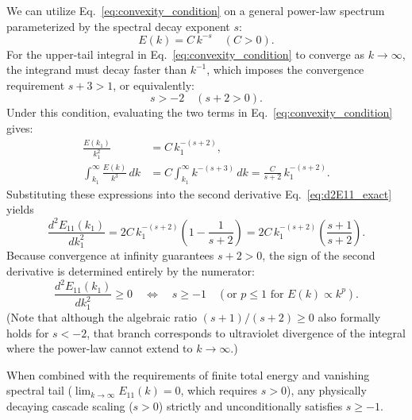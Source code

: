 \documentclass[lineno]{jfm}
\begin{document}
We can utilize Eq.~\eqref{eq:convexity_condition} on a general power-law spectrum parameterized by the spectral decay exponent $s$:
\begin{equation}
E(k) = C\,k^{-s} \quad (C > 0).
\label{eq:general_power_law}
\end{equation}
For the upper-tail integral in Eq.~\eqref{eq:convexity_condition} to converge as $k \to \infty$, the integrand must decay faster than $k^{-1}$, which imposes the convergence requirement $s+3 > 1$, or equivalently:
\begin{equation}
s > -2 \quad (s+2 > 0).
\label{eq:convergence_req}
\end{equation}
Under this condition, evaluating the two terms in Eq.~\eqref{eq:convexity_condition} gives:
\begin{align}
\frac{E(k_1)}{k_1^2} &= C\,k_1^{-(s+2)}, \\
\int_{k_1}^\infty \frac{E(k)}{k^3}\,dk &= C \int_{k_1}^\infty k^{-(s+3)}\,dk = \frac{C}{s+2}\,k_1^{-(s+2)}.
\end{align}
Substituting these expressions into the second derivative Eq.~\eqref{eq:d2E11_exact} yields
\begin{equation}
\frac{d^2 E_{11}(k_1)}{d k_1^2} = 2 C\,k_1^{-(s+2)} \left( 1 - \frac{1}{s+2} \right) = 2 C\,k_1^{-(s+2)} \left( \frac{s+1}{s+2} \right).
\label{eq:power_law_convex}
\end{equation}
Because convergence at infinity guarantees $s+2 > 0$, the sign of the second derivative is determined entirely by the numerator:
\begin{equation}
\frac{d^2 E_{11}(k_1)}{d k_1^2} \ge 0 \quad \Longleftrightarrow \quad s \ge -1 \quad (\text{or } p \le 1 \text{ for } E(k) \propto k^p).
\label{eq:exponent_bound}
\end{equation}
(Note that although the algebraic ratio $(s+1)/(s+2) \ge 0$ also formally holds for $s < -2$, that branch corresponds to ultraviolet divergence of the integral where the power-law cannot extend to $k \to \infty$.)

When combined with the requirements of finite total energy and vanishing spectral tail ($\lim_{k \to \infty} E_{11}(k) = 0$, which requires $s > 0$), any physically decaying cascade scaling ($s > 0$) strictly and unconditionally satisfies $s \ge -1$.
\end{document}
